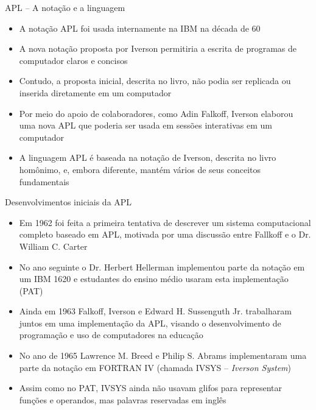 \begin{frame}[fragile]{APL -- A notação e a linguagem}

    \begin{itemize}
        \item A notação APL foi usada internamente na IBM na década de 60
        \pause

        \item A nova notação proposta por Iverson permitiria a escrita de programas de computador claros e concisos
        \pause

        \item Contudo, a proposta inicial, descrita no livro, não podia ser replicada ou inserida diretamente em um computador
        \pause

        \item Por meio do apoio de colaboradores, como Adin Falkoff, Iverson elaborou uma nova APL que poderia ser usada em sessões interativas em um computador
        \pause

        \item A linguagem APL é baseada na notação de Iverson, descrita no livro homônimo, e, embora diferente, mantém vários de seus conceitos fundamentais
    \end{itemize}

\end{frame}

\begin{frame}[fragile]{Desenvolvimentos iniciais da APL}

    \begin{itemize}
        \item Em 1962 foi feita a primeira tentativa de descrever um sistema computacional completo baseado em APL, motivada por uma discussão entre Fallkoff e o Dr. William C. Carter
        \pause

        \item No ano seguinte o Dr. Herbert Hellerman implementou parte da notação em um IBM 1620 e estudantes do ensino médio usaram esta implementação (PAT)
        \pause

        \item Ainda em 1963 Falkoff, Iverson e Edward H. Sussenguth Jr. trabalharam juntos em uma implementação da APL, visando o desenvolvimento de programação e uso de computadores na educação
        \pause

        \item No ano de 1965 Lawrence M. Breed e Philip S. Abrams implementaram uma parte da notação em FORTRAN IV (chamada IVSYS -- \textit{Iverson System})
        \pause

        \item Assim como no PAT, IVSYS ainda não usavam glifos para representar funções e operandos, mas palavras reservadas em inglês
    \end{itemize}

\end{frame}

